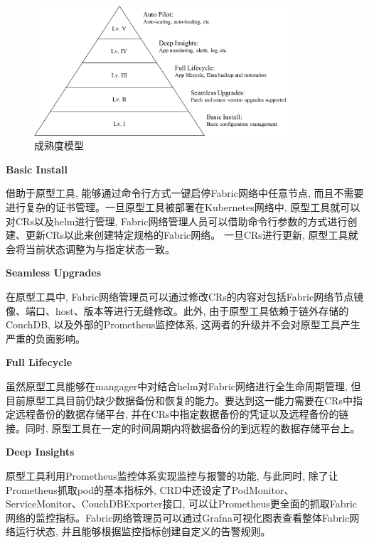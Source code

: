 \begin{figure}[h] %
    \centering %
    \includegraphics[width=0.85\textwidth]{FIGs/chapter5/maturity.pdf} %
    \caption{成熟度模型} %
    \label{maturity} %
\end{figure}%

\textbf{Basic Install}

借助于原型工具, 能够通过命令行方式一键启停Fabric网络中任意节点, 而且不需要进行复杂的证书管理。一旦原型工具被部署在Kubernetes网络中, 原型工具就可以对CRs以及helm进行管理, Fabric网络管理人员可以借助命令行参数的方式进行创建、更新CRs以此来创建特定规格的Fabric网络。 一旦CRs进行更新, 原型工具就会将当前状态调整为与指定状态一致。

\textbf{Seamless Upgrades}

在原型工具中, Fabric网络管理员可以通过修改CRs的内容对包括Fabric网络节点镜像、端口、host、版本等进行无缝修改。此外, 由于原型工具依赖于链外存储的CouchDB, 以及外部的Prometheus监控体系, 这两者的升级并不会对原型工具产生严重的负面影响。 

\textbf{Full Lifecycle}

虽然原型工具能够在mangager中对结合helm对Fabric网络进行全生命周期管理, 但目前原型工具目前仍缺少数据备份和恢复的能力。要达到这一能力需要在CRs中指定远程备份的数据存储平台, 并在CRs中指定数据备份的凭证以及远程备份的链接。同时, 原型工具在一定的时间周期内将数据备份的到远程的数据存储平台上。

\textbf{Deep Insights}

原型工具利用Prometheus监控体系实现监控与报警的功能, 与此同时, 除了让Prometheus抓取pod的基本指标外, CRD中还设定了PodMonitor、ServiceMonitor、CouchDBExporter接口, 可以让Prometheus更全面的抓取Fabric网络的监控指标。Fabric网络管理员可以通过Grafna可视化图表查看整体Fabric网络运行状态, 并且能够根据监控指标创建自定义的告警规则。

